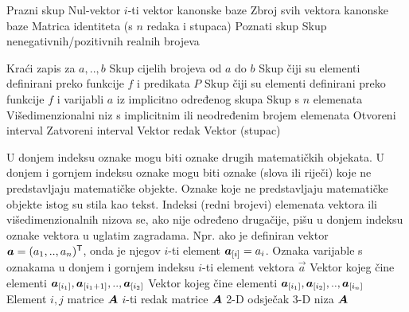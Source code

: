 	{Prazni skup}
	{Nul-vektor}
	{$i$-ti vektor kanonske baze}
	{Zbroj svih vektora kanonske baze}
	{Matrica identiteta (s $n$ redaka i stupaca)}
	{Poznati skup}
	{Skup nenegativnih/pozitivnih realnih brojeva}

	{Kraći zapis za $a,..,b$}
	{Skup cijelih brojeva od $a$ do $b$}
	{Skup čiji su elementi definirani preko funkcije $f$ i predikata $P$}
	{Skup čiji su elementi definirani preko funkcije $f$ i varijabli $a$ iz implicitno određenog skupa}
	{Skup s $n$ elemenata}
	{Višedimenzionalni niz s implicitnim ili neodređenim brojem elemenata}
	{Otvoreni interval}
	{Zatvoreni interval}
	{Vektor redak}
	{Vektor (stupac)}

{U donjem indeksu oznake mogu biti oznake drugih matematičkih objekata. U donjem i gornjem indeksu oznake mogu biti oznake (slova ili riječi) koje ne predstavljaju matematičke objekte. Oznake koje ne predstavljaju matematičke objekte istog su stila kao tekst. Indeksi (redni brojevi) elemenata vektora ili višedimenzionalnih nizova se, ako nije određeno drugačije, pišu u donjem indeksu oznake vektora u uglatim zagradama. Npr. ako je definiran vektor $\vec a=(a_1,.., a_n)^\tp$, onda je njegov $i$-ti element $\vec a_{\sbr{i}}=a_i$.}
	{Oznaka varijable s oznakama u donjem i gornjem indeksu}
	{$i$-ti element vektora $\vec{a}$}
	{Vektor kojeg čine elementi $\vec{a}_{\sbr{i_1}}, \vec{a}_{\sbr{i_1+1}},.., \vec{a}_{\sbr{i_2}}$}
	{Vektor kojeg čine elementi $\vec{a}_{\sbr{i_1}}, \vec{a}_{\sbr{i_2}},.., \vec{a}_{\sbr{i_n}}$}
	{Element $i,j$ matrice $\mat A$}
	{$i$-ti redak matrice $\mat A$}
	{2-D odsječak 3-D niza $\mat A$}

